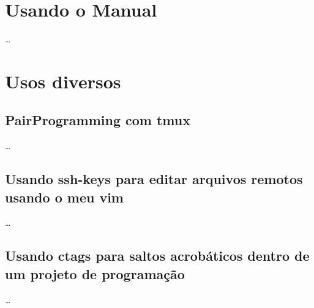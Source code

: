 \documentclass[a4paper,12pt,oneside]{book}
\begin{document}
\newpage
\chapter{Usando o Manual}
\ldots

\newpage
\chapter{Usos diversos}
\section{PairProgramming com tmux}
\ldots
\section{Usando ssh-keys para editar arquivos remotos usando o meu vim}
\ldots
\section{Usando ctags para saltos acrobáticos dentro de um projeto de programação}
\ldots

\end{document}
